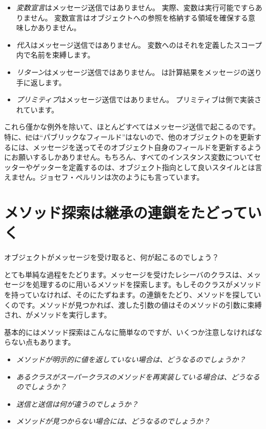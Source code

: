 \documentclass[a4paper,10pt,twoside]{book}
\begin{document}
\begin{itemize}
  \item \emph{変数宣言}はメッセージ送信ではありません。
		実際、変数は実行可能ですらありません。
		変数宣言はオブジェクトへの参照を格納する領域を確保する意味しかありません。
  \item \emph{代入}はメッセージ送信ではありません。
		変数へのはそれを定義したスコープ内で名前を束縛します。
  \item \emph{リターン}はメッセージ送信ではありません。
		は計算結果をメッセージの送り手に返します。
  \item \emph{プリミティブ}はメッセージ送信ではありません。
		プリミティブは側で実装されています。
\end{itemize}
これら僅かな例外を除いて、ほとんどすべてはメッセージ送信で起こるのです。特に、\st には``パブリックなフィールド''はないので、他のオブジェクトのを更新するには、メッセージを送ってそのオブジェクト自身のフィールドを更新するようにお願いするしかありません。もちろん、すべてのインスタンス変数についてセッターやゲッターを定義するのは、オブジェクト指向として良いスタイルとは言えません。ジョセフ・ペルリンは次のようにも言っています。

\section{メソッド探索は継承の連鎖をたどっていく}


オブジェクトがメッセージを受け取ると、何が起こるのでしょう？

とても単純な過程をたどります。メッセージを受けたレシーバのクラスは、メッセージを処理するのに用いるメソッドを探索します。もしそのクラスがメソッドを持っていなければ、そのにたずねます。の連鎖をたどり、メソッドを探していくのです。メソッドが見つかれば、渡した引数の値はそのメソッドの引数に束縛され、がメソッドを実行します。

基本的にはメソッド探索はこんなに簡単なのですが、いくつか注意しなければならない点もあります。

\begin{itemize}
  \item \emph{メソッドが明示的に値を返していない場合は、どうなるのでしょうか？}
  \item \emph{あるクラスがスーパークラスのメソッドを再実装している場合は、どうなるのでしょうか？}
  \item \emph{送信と送信は何が違うのでしょうか？}
  \item \emph{メソッドが見つからない場合には、どうなるのでしょうか？}
\end{itemize}
\end{document}

